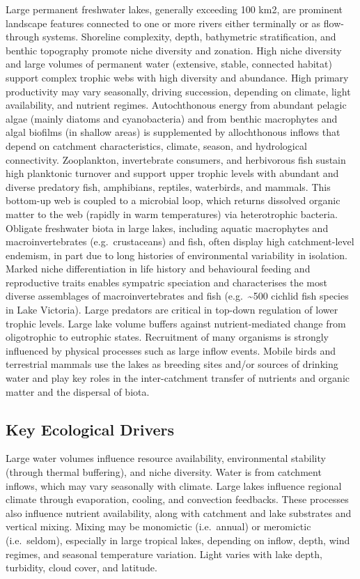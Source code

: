 \documentclass[
  letterpaper,
  DIV=11,
  numbers=noendperiod]{scrartcl}
\begin{document}
Large permanent freshwater lakes, generally exceeding 100 km2, are
prominent landscape features connected to one or more rivers either
terminally or as flow-through systems. Shoreline complexity, depth,
bathymetric stratification, and benthic topography promote niche
diversity and zonation. High niche diversity and large volumes of
permanent water (extensive, stable, connected habitat) support complex
trophic webs with high diversity and abundance. High primary
productivity may vary seasonally, driving succession, depending on
climate, light availability, and nutrient regimes. Autochthonous energy
from abundant pelagic algae (mainly diatoms and cyanobacteria) and from
benthic macrophytes and algal biofilms (in shallow areas) is
supplemented by allochthonous inflows that depend on catchment
characteristics, climate, season, and hydrological connectivity.
Zooplankton, invertebrate consumers, and herbivorous fish sustain high
planktonic turnover and support upper trophic levels with abundant and
diverse predatory fish, amphibians, reptiles, waterbirds, and mammals.
This bottom-up web is coupled to a microbial loop, which returns
dissolved organic matter to the web (rapidly in warm temperatures) via
heterotrophic bacteria. Obligate freshwater biota in large lakes,
including aquatic macrophytes and macroinvertebrates (e.g.~crustaceans)
and fish, often display high catchment-level endemism, in part due to
long histories of environmental variability in isolation. Marked niche
differentiation in life history and behavioural feeding and reproductive
traits enables sympatric speciation and characterises the most diverse
assemblages of macroinvertebrates and fish (e.g.~\textasciitilde500
cichlid fish species in Lake Victoria). Large predators are critical in
top-down regulation of lower trophic levels. Large lake volume buffers
against nutrient-mediated change from oligotrophic to eutrophic states.
Recruitment of many organisms is strongly influenced by physical
processes such as large inflow events. Mobile birds and terrestrial
mammals use the lakes as breeding sites and/or sources of drinking water
and play key roles in the inter-catchment transfer of nutrients and
organic matter and the dispersal of biota.

\subsection{Key Ecological Drivers}\label{key-ecological-drivers-116}

Large water volumes influence resource availability, environmental
stability (through thermal buffering), and niche diversity. Water is
from catchment inflows, which may vary seasonally with climate. Large
lakes influence regional climate through evaporation, cooling, and
convection feedbacks. These processes also influence nutrient
availability, along with catchment and lake substrates and vertical
mixing. Mixing may be monomictic (i.e.~annual) or meromictic
(i.e.~seldom), especially in large tropical lakes, depending on inflow,
depth, wind regimes, and seasonal temperature variation. Light varies
with lake depth, turbidity, cloud cover, and latitude.
\end{document}
